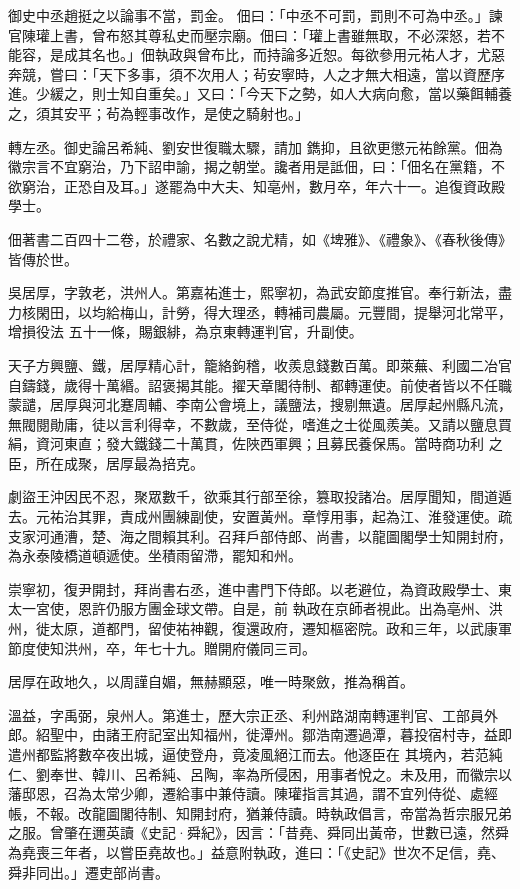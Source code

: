 \begin{pinyinscope}
 御史中丞趙挺之以論事不當，罰金。
 佃曰：「中丞不可罰，罰則不可為中丞。」諫官陳瓘上書，曾布怒其尊私史而壓宗廟。佃曰：「瓘上書雖無取，不必深怒，若不能容，是成其名也。」佃執政與曾布比，而持論多近恕。每欲參用元祐人才，尤惡奔競，嘗曰：「天下多事，須不次用人；茍安寧時，人之才無大相遠，當以資歷序進。少緩之，則士知自重矣。」又曰：「今天下之勢，如人大病向愈，當以藥餌輔養之，須其安平；茍為輕事改作，是使之騎射也。」



 轉左丞。御史論呂希純、劉安世復職太驟，請加
 鐫抑，且欲更懲元祐餘黨。佃為徽宗言不宜窮治，乃下詔申諭，揭之朝堂。讒者用是詆佃，曰：「佃名在黨籍，不欲窮治，正恐自及耳。」遂罷為中大夫、知亳州，數月卒，年六十一。追復資政殿學士。



 佃著書二百四十二卷，於禮家、名數之說尤精，如《埤雅》、《禮象》、《春秋後傳》皆傳於世。



 吳居厚，字敦老，洪州人。第嘉祐進士，熙寧初，為武安節度推官。奉行新法，盡力核閑田，以均給梅山，計勞，得大理丞，轉補司農屬。元豐間，提舉河北常平，增損役法
 五十一條，賜銀緋，為京東轉運判官，升副使。



 天子方興鹽、鐵，居厚精心計，籠絡鉤稽，收羨息錢數百萬。即萊蕪、利國二冶官自鑄錢，歲得十萬緡。詔褒揭其能。擢天章閣待制、都轉運使。前使者皆以不任職蒙譴，居厚與河北蹇周輔、李南公會境上，議鹽法，搜剔無遺。居厚起州縣凡流，無閥閱勛庸，徒以言利得幸，不數歲，至侍從，嗜進之士從風羨美。又請以鹽息買絹，資河東直；發大鐵錢二十萬貫，佐陜西軍興；且募民養保馬。當時商功利
 之臣，所在成聚，居厚最為掊克。



 劇盜王沖因民不忍，聚眾數千，欲乘其行部至徐，篡取投諸冶。居厚聞知，間道遁去。元祐治其罪，責成州團練副使，安置黃州。章惇用事，起為江、淮發運使。疏支家河通漕，楚、海之間賴其利。召拜戶部侍郎、尚書，以龍圖閣學士知開封府，為永泰陵橋道頓遞使。坐積雨留滯，罷知和州。



 崇寧初，復尹開封，拜尚書右丞，進中書門下侍郎。以老避位，為資政殿學士、東太一宮使，恩許仍服方團金球文帶。自是，前
 執政在京師者視此。出為亳州、洪州，徙太原，道都門，留使祐神觀，復還政府，遷知樞密院。政和三年，以武康軍節度使知洪州，卒，年七十九。贈開府儀同三司。



 居厚在政地久，以周謹自媚，無赫顯惡，唯一時聚斂，推為稱首。



 溫益，字禹弼，泉州人。第進士，歷大宗正丞、利州路湖南轉運判官、工部員外郎。紹聖中，由諸王府記室出知福州，徙潭州。鄒浩南遷過潭，暮投宿村寺，益即遣州都監將數卒夜出城，逼使登舟，竟凌風絕江而去。他逐臣在
 其境內，若范純仁、劉奉世、韓川、呂希純、呂陶，率為所侵困，用事者悅之。未及用，而徽宗以藩邸恩，召為太常少卿，遷給事中兼侍讀。陳瓘指言其過，謂不宜列侍從、處經帳，不報。改龍圖閣待制、知開封府，猶兼侍讀。時執政倡言，帝當為哲宗服兄弟之服。曾肇在邇英讀《史記·舜紀》，因言：「昔堯、舜同出黃帝，世數已遠，然舜為堯喪三年者，以嘗臣堯故也。」益意附執政，進曰：「《史記》世次不足信，堯、舜非同出。」遷吏部尚書。




\end{pinyinscope}
